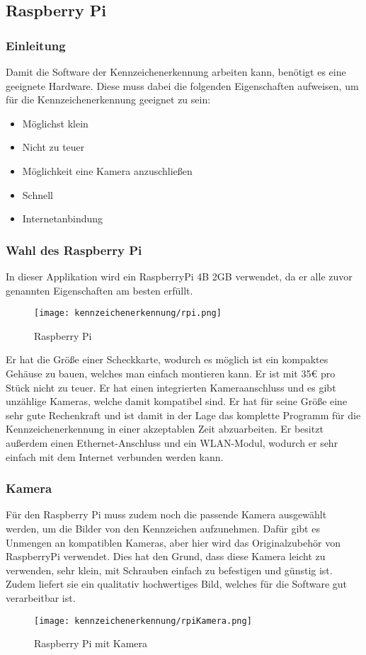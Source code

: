\subsection{Raspberry Pi}

\subsubsection{Einleitung}
Damit die Software der Kennzeichenerkennung arbeiten kann, benötigt es eine geeignete Hardware. Diese muss dabei die folgenden Eigenschaften 
aufweisen, um für die Kennzeichenerkennung geeignet zu sein:

\begin{itemize}
    \item Möglichst klein
    \item Nicht zu teuer 
    \item Möglichkeit eine Kamera anzuschließen 
    \item Schnell 
    \item Internetanbindung
\end{itemize}

\subsubsection{Wahl des Raspberry Pi}
In dieser Applikation wird ein RaspberryPi 4B 2GB verwendet, da er alle zuvor genannten Eigenschaften am besten erfüllt.\\

\begin{figure}[H]
    \centering
    \texttt{[image: kennzeichenerkennung/rpi.png]}
    \caption{Raspberry Pi}
\end{figure}

Er hat die Größe einer Scheckkarte, wodurch es möglich ist ein kompaktes Gehäuse zu bauen, welches man einfach montieren kann. 
Er ist mit 35€ pro Stück nicht zu teuer. Er hat einen integrierten Kameraanschluss und es gibt unzählige Kameras, welche damit 
kompatibel sind. Er hat für seine Größe eine sehr gute Rechenkraft und ist damit in der Lage das komplette Programm für die 
Kennzeichenerkennung in einer akzeptablen Zeit abzuarbeiten. Er besitzt außerdem einen Ethernet-Anschluss und ein WLAN-Modul, 
wodurch er sehr einfach mit dem Internet verbunden werden kann.

\subsubsection{Kamera}
Für den Raspberry Pi muss zudem noch die passende Kamera ausgewählt werden, um die Bilder von den Kennzeichen aufzunehmen. 
Dafür gibt es Unmengen an kompatiblen Kameras, aber hier wird das Originalzubehör von RaspberryPi verwendet. Dies hat den Grund, 
dass diese Kamera leicht zu verwenden, sehr klein, mit Schrauben einfach zu befestigen und günstig ist. Zudem liefert sie ein 
qualitativ hochwertiges Bild, welches für die Software gut verarbeitbar ist.

\begin{figure}[H]
    \centering
    \texttt{[image: kennzeichenerkennung/rpiKamera.png]}
    \caption{Raspberry Pi mit Kamera}
\end{figure}